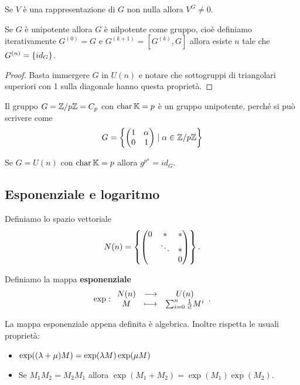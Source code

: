 \begin{corollary}
    Se $V$ \`e una rappresentazione di $G$ non nulla allora $V^G\neq 0$.
\end{corollary}

\begin{corollary}
    Se $G$ \`e unipotente allora $G$ \`e nilpotente come gruppo, cio\`e definiamo iterativamente $G^{(0)}=G$ e $G^{(k+1)}=[G^{(k)},G]$ allora esiste $n$ tale che $G^{(n)}=\left\{{id_G}\right\}$.
\end{corollary}
\begin{proof}
Basta immergere $G$ in $U(n)$ e notare che sottogruppi di triangolari superiori con 1 sulla diagonale hanno questa propriet\`a.
\end{proof}


\begin{example}
Il gruppo $G={\mathbb{Z}/{p}\mathbb{Z}}=C_p$ con $\operatorname{char} \mathbb{K}=p$ \`e un gruppo unipotente, perch\'e si pu\`o scrivere come
\[G=\left\{{\begin{pmatrix}1&\alpha\\0&1\end{pmatrix}\mid \alpha\in{\mathbb{Z}/{p}\mathbb{Z}}}\right\}\]
\end{example}
\begin{remark}
Se $G=U(n)$ con $\operatorname{char} \mathbb{K}=p$ allora $g^{p^n}=id_G$.
\end{remark}

\subsection{Esponenziale e logaritmo}

\begin{notation}
Definiamo lo spazio vettoriale
\[N(n)=\left\{{\begin{pmatrix}0&\ast&\ast\\&\ddots&\ast\\&&0\end{pmatrix}}\right\}.\]
\end{notation}

\begin{definition}[Esponenziale]
Definiamo la mappa \textbf{esponenziale}
\[\exp:\begin{array}{ccc} {N(n)} & \longrightarrow & {U(n)}\\ {M} & \longmapsto & {\sum_{i=0}^n\frac1{i!}M^i} \end{array}.\]
\end{definition}
\begin{remark}
La mappa esponenziale appena definita \`e algebrica. Inoltre rispetta le usuali propriet\`a:
\begin{itemize}
    \item $\exp((\lambda+\mu)M)=\exp(\lambda M)\exp(\mu M)$
    \item Se $M_1M_2=M_2M_1$ allora $\exp(M_1+M_2)=\exp(M_1)\exp(M_2)$.
\end{itemize}
\end{remark}

